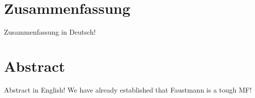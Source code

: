 
\section*{Zusammenfassung}
Zusammenfassung in Deutsch!

\pagebreak

\section*{Abstract}
Abstract in English! We have already established 
that Faustmann \cite{lecture_notes_faustmann_numPDE}
is a tough MF!
